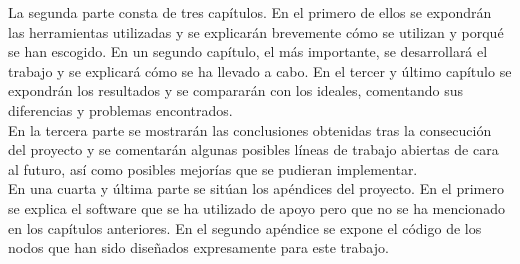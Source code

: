 La segunda parte consta de tres capítulos. En el primero de ellos se expondrán las herramientas utilizadas y se explicarán brevemente cómo se utilizan y porqué se han escogido. En un segundo capítulo, el más importante, se desarrollará el trabajo y se explicará cómo se ha llevado a cabo. En el tercer y último capítulo se expondrán los resultados y se compararán con los ideales, comentando sus diferencias y problemas encontrados.\\

En la tercera parte se mostrarán las conclusiones obtenidas tras la consecución del proyecto y se comentarán algunas posibles líneas de trabajo abiertas de cara al futuro, así como posibles mejorías que se pudieran implementar. \\

En una cuarta y última parte se sitúan los apéndices del proyecto. En el primero se explica el software que se ha utilizado de apoyo pero que no se ha mencionado en los capítulos anteriores. En el segundo apéndice se expone el código de los nodos que han sido diseñados expresamente para este trabajo.\\



























